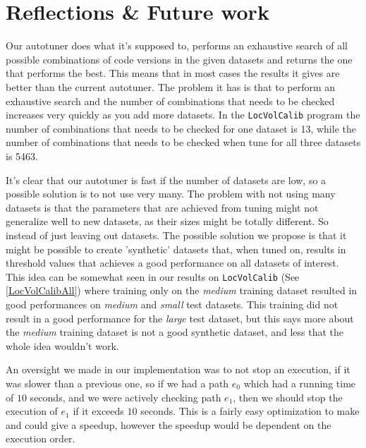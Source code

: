 \section{Reflections \& Future work}
\label{synData}
Our autotuner does what it's supposed to, performs an exhaustive search of all
possible combinations of code versions in the given datasets and returns the
one that performs the best. This means that in most cases the results it gives
are better than the current autotuner. The problem it has is that to perform an
exhaustive search and the number of combinations that needs to be checked increases
very quickly as you add more datasets. In the \texttt{LocVolCalib} program the
number of combinations that needs to be checked for one dataset is 13, while
the number of combinations that needs to be checked when tune for all
three datasets is 5463. 

It's clear that our autotuner is fast if the number of datasets are low, so a
possible solution is to not use very many. The problem with not using many
datasets is that the parameters that are achieved from tuning might not
generalize well to new datasets, as their sizes might be totally different. So
instead of just leaving out datasets. The possible solution we propose is that
it might be possible to create 'synthetic' datasets that, when tuned on,
results in threshold values that achieves a good performance on all datasets of
interest. 
This idea can be somewhat seen in our results on \texttt{LocVolCalib} (See \ref{LocVolCalibAll})
where training only on the \textit{medium} training  dataset resulted in good
performances on \textit{medium} and \textit{small} test datasets. This training
did not result in a good performance for the \textit{large} test dataset, but
this says more about the \textit{medium} training dataset is not a good
synthetic dataset, and less that the whole idea wouldn't work.

An oversight we made in our implementation was to not stop an execution, if it was slower than a previous one, so if we had a path $e_0$ which had a running time of $10$ seconds, and we were actively checking path $e_1$, then we should stop the execution of $e_1$ if it exceeds $10$ seconds. This is a fairly easy optimization to make and could give a speedup, however the speedup would be dependent on the execution order. 
